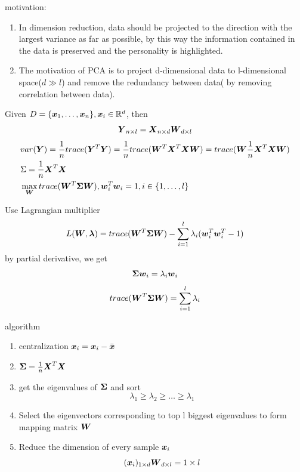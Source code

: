 \documentclass[11pt]{article}
\begin{document}
motivation:
\begin{enumerate}
\item In dimension reduction, data should be projected to the direction with
the largest variance as far as possible, by this way the information
contained in the data is preserved and the personality is highlighted.
\item The motivation of PCA is to project d-dimensional data to l-dimensional
space(\(d\gg l\)) and remove the redundancy between data( by removing
correlation between data).
\end{enumerate}


Given \(D=\{\boldsymbol{x}_1,\dots,\boldsymbol{x}_n\}, \boldsymbol{x}_i\in\mathbb{R}^d\), then
\begin{equation*}
\boldsymbol{Y}_{n\times l}=\boldsymbol{X}_{n\times d} \boldsymbol{W}_{d\times l}
\end{equation*}
\begin{align*}
&var(\boldsymbol{Y})=\frac{1}{n}trace(\boldsymbol{Y}^T\boldsymbol{Y})=\frac{1}{n}trace(\boldsymbol{W}^T\boldsymbol{X}^T
\boldsymbol{X}\boldsymbol{W})=trace(\boldsymbol{W}\frac{1}{n}\boldsymbol{X}^T\boldsymbol{X}\boldsymbol{W})\\
&\Sigma=\frac{1}{n}\boldsymbol{X}^T\boldsymbol{X}\\
&\max_{\boldsymbol{W}}trace(\boldsymbol{W}^T\boldsymbol{\Sigma}\boldsymbol{W}), \boldsymbol{w}_i^T\boldsymbol{w}_i=1,i\in\{1,\dots,l\}
\end{align*}

Use Lagrangian multiplier
\begin{equation*}
L(\boldsymbol{W},\boldsymbol{\lambda})=trace(\boldsymbol{W}^T\boldsymbol{\Sigma}\boldsymbol{W})-\displaystyle\sum_{i=1}^l
\lambda_i(\boldsymbol{w}_i^T\boldsymbol{w}_i^T-1)
\end{equation*}
by partial derivative, we get
\begin{equation*}
\boldsymbol{\Sigma}\boldsymbol{w}_i=\lambda_i\boldsymbol{w}_i
\end{equation*}
\begin{equation*}
trace(\boldsymbol{W}^T\boldsymbol{\Sigma}\boldsymbol{W})=\displaystyle\sum_{i=1}^l\lambda_i
\end{equation*}

algorithm
\begin{enumerate}
\item centralization \(\boldsymbol{x}_i=\boldsymbol{x}_i-\bar{\boldsymbol{x}}\)
\item \(\boldsymbol{\Sigma}=\frac{1}{n}\boldsymbol{X}^T\boldsymbol{X}\)
\item get the eigenvalues of \(\boldsymbol{\Sigma}\) and sort
\begin{equation*}
\lambda_1\ge \lambda_2\ge\dots\ge \lambda_1
\end{equation*}
\item Select the eigenvectors corresponding to top l biggest eigenvalues to form
mapping matrix \(\boldsymbol{W}\)
\item Reduce the dimension of every sample \(\boldsymbol{x}_i\)
\begin{equation*}
(\boldsymbol{x}_i)_{1\times d}\boldsymbol{W}_{d\times l}=1\times l
\end{equation*}
\end{enumerate}
\end{document}
